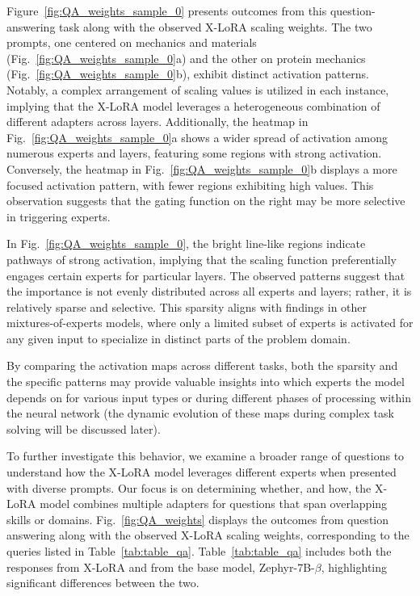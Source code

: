 Figure~\ref{fig:QA_weights_sample_0} presents outcomes from this question-answering task along with the observed X-LoRA scaling weights. The two prompts, one centered on mechanics and materials (Fig.~\ref{fig:QA_weights_sample_0}a) and the other on protein mechanics (Fig.~\ref{fig:QA_weights_sample_0}b), exhibit distinct activation patterns. Notably, a complex arrangement of scaling values is utilized in each instance, implying that the X-LoRA model leverages a heterogeneous combination of different adapters across layers. Additionally, the heatmap in Fig.~\ref{fig:QA_weights_sample_0}a shows a wider spread of activation among numerous experts and layers, featuring some regions with strong activation. Conversely, the heatmap in Fig.~\ref{fig:QA_weights_sample_0}b displays a more focused activation pattern, with fewer regions exhibiting high values. This observation suggests that the gating function on the right may be more selective in triggering experts.

In Fig.~\ref{fig:QA_weights_sample_0}, the bright line-like regions indicate pathways of strong activation, implying that the scaling function preferentially engages certain experts for particular layers. The observed patterns suggest that the importance is not evenly distributed across all experts and layers; rather, it is relatively sparse and selective. This sparsity aligns with findings in other mixtures-of-experts models, where only a limited subset of experts is activated for any given input to specialize in distinct parts of the problem domain.

By comparing the activation maps across different tasks, both the sparsity and the specific patterns may provide valuable insights into which experts the model depends on for various input types or during different phases of processing within the neural network (the dynamic evolution of these maps during complex task solving will be discussed later).

To further investigate this behavior, we examine a broader range of questions to understand how the X-LoRA model leverages different experts when presented with diverse prompts. Our focus is on determining whether, and how, the X-LoRA model combines multiple adapters for questions that span overlapping skills or domains. Fig.~\ref{fig:QA_weights} displays the outcomes from question answering along with the observed X-LoRA scaling weights, corresponding to the queries listed in Table~\ref{tab:table_qa}. Table~\ref{tab:table_qa} includes both the responses from X-LoRA and from the base model, Zephyr-7B-$\beta$, highlighting significant differences between the two.

